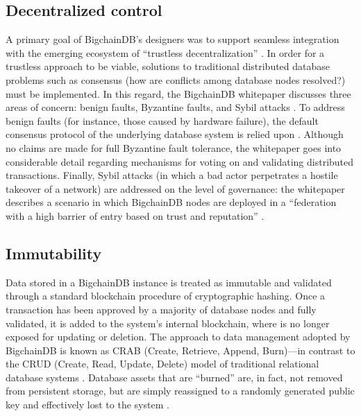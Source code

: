 \documentclass[sigconf]{acmart}
\begin{document}
\subsection{Decentralized control}
A primary goal of BigchainDB's designers was to support seamless integration with the emerging ecosystem of ``trustless decentralization'' \cite{bigDB16}. In order for a trustless approach to be viable, solutions to traditional distributed database problems such as consensus (how are conflicts among database nodes resolved?) must be implemented. In this regard, the BigchainDB whitepaper discusses three areas of concern: benign faults, Byzantine faults, and Sybil attacks \cite{bigDB16}. To address benign faults (for instance, those caused by hardware failure), the default consensus protocol of the underlying database system is relied upon \citep{bigDB16}. Although no claims are made for full Byzantine fault tolerance, the whitepaper goes into considerable detail regarding mechanisms for voting on and validating distributed transactions. Finally, Sybil attacks (in which a bad actor perpetrates a hostile takeover of a network) are addressed on the level of governance: the whitepaper describes a scenario in which BigchainDB nodes are deployed in a ``federation with a high barrier of entry based on trust and reputation'' \citep{bigDB16}.

\subsection{Immutability}
Data stored in a BigchainDB instance is treated as immutable and validated through a standard blockchain procedure of cryptographic hashing. Once a transaction has been approved by a majority of database nodes and fully validated, it is added to the system's internal blockchain, where is no longer exposed for updating or deletion. The approach to data management adopted by BigchainDB is known as CRAB (Create, Retrieve, Append, Burn)---in contrast to the CRUD (Create, Read, Update, Delete) model of traditional relational database systems \cite{jP17}. Database assets that are ``burned'' are, in fact, not removed from persistent storage, but are simply reassigned to a randomly generated public key and effectively lost to the system \citep{jP17}.
\end{document}
